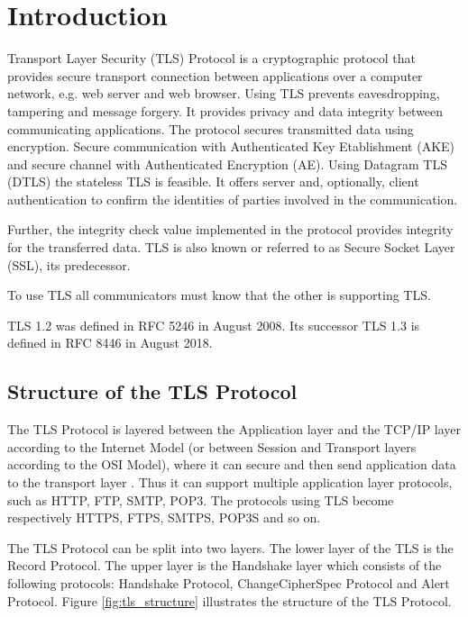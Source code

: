 \chapter{Introduction}
\label{chap:introduction}

Transport Layer Security (TLS) Protocol is a cryptographic protocol that provides secure transport connection between applications over a computer network, e.g. web server and web browser. 
 Using TLS prevents eavesdropping, tampering and message forgery. It provides privacy and data integrity between communicating applications. The protocol secures transmitted data using encryption. Secure communication with Authenticated Key Etablishment (AKE) and secure channel with Authenticated Encryption (AE). 
 Using Datagram TLS (DTLS) the stateless TLS is feasible. It offers server and, optionally, client authentication to confirm the identities of parties involved in the communication. 
 
 Further, the integrity check value implemented in the protocol provides integrity for the transferred data. TLS is also known or referred to as Secure Socket Layer (SSL), its predecessor. 
 
To use TLS all communicators must know that the other is supporting TLS.

TLS 1.2 was defined in RFC 5246 in August 2008. Its successor TLS 1.3 is defined in RFC 8446 in August 2018.
 \cite{RFC5246}

\section{Structure of the TLS Protocol}
\label{sec:stucture}

The TLS Protocol is layered between the Application layer and the TCP/IP layer according to the Internet Model (or between Session and Transport layers according to the OSI Model), where it can secure and then send application data to the transport layer \cite{ms:overview}. Thus it can support multiple application layer protocols, such as HTTP, FTP, SMTP, POP3. The protocols using TLS become respectively HTTPS, FTPS, SMTPS, POP3S and so on.

The TLS Protocol can be split into two layers. The lower layer of the TLS is the Record Protocol. The upper layer is the Handshake layer which consists of the following protocols: Handshake Protocol, ChangeCipherSpec Protocol and Alert Protocol. Figure \ref{fig:tls_structure} illustrates the structure of the TLS Protocol. 


